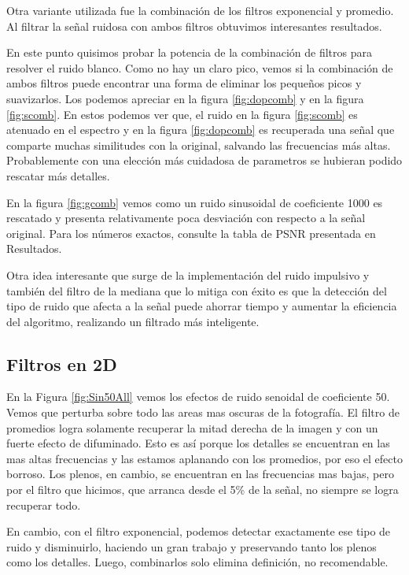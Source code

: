 Otra variante utilizada fue la combinaci\'on de los filtros exponencial y
promedio. Al filtrar la se\~nal ruidosa con ambos filtros obtuvimos interesantes
resultados.

En este punto quisimos probar la potencia de la combinaci\'on de filtros para resolver
el ruido blanco. Como no hay un claro pico, vemos si la combinaci\'on de ambos
filtros puede encontrar una forma de eliminar los peque\~nos picos y suavizarlos.
Los podemos apreciar en la figura \ref{fig:dopcomb} y en la figura \ref{fig:scomb}.
En estos podemos ver que, el ruido en la figura \ref{fig:scomb} es atenuado
en el espectro y en la figura \ref{fig:dopcomb} es recuperada una se\~nal que
comparte muchas similitudes con la original, salvando las frecuencias
m\'as altas. Probablemente con una elecci\'on m\'as cuidadosa de parametros
se hubieran podido rescatar m\'as detalles.

En la figura \ref{fig:gcomb} vemos como un ruido sinusoidal de coeficiente 1000
es rescatado y presenta relativamente poca desviaci\'on con respecto
a la se\~nal original. Para los n\'umeros exactos, consulte la tabla de
PSNR presentada en Resultados.

Otra idea interesante que surge de la implementaci\'on del ruido impulsivo y tambi\'en del
filtro de la mediana que lo mitiga con \'exito es que la detecci\'on del tipo de ruido que afecta
a la se\~nal puede ahorrar tiempo y aumentar la eficiencia del algoritmo, realizando un filtrado m\'as
inteligente.

\subsection{Filtros en 2D}


En la Figura \ref{fig:Sin50All} vemos los efectos de ruido senoidal
de coeficiente 50. Vemos que perturba sobre todo las areas mas oscuras
de la fotograf\'ia. El filtro de promedios logra solamente recuperar la mitad
derecha de la imagen y con un fuerte efecto de difuminado.
Esto es as\'i porque los detalles se encuentran en las mas altas frecuencias
y las estamos aplanando con los promedios, por eso el efecto borroso.
Los plenos, en cambio, se encuentran en las frecuencias mas bajas, pero
por el filtro que hicimos, que arranca desde el 5\% de la señal,
no siempre se logra recuperar todo.

En cambio, con el filtro exponencial, podemos detectar exactamente ese
tipo de ruido y disminuirlo, haciendo un gran trabajo y preservando tanto
los plenos como los detalles. Luego, combinarlos solo elimina definici\'on,
no recomendable.\\


